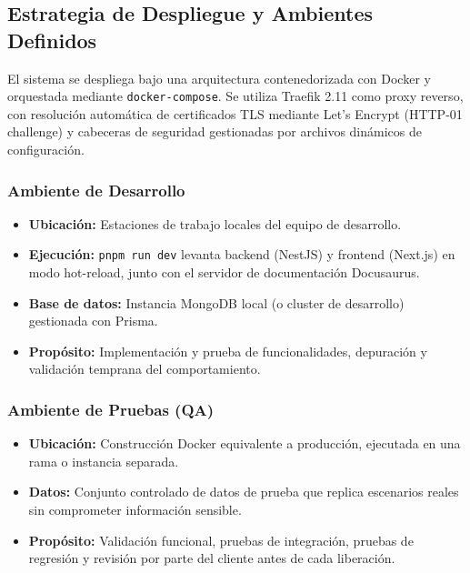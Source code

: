 \subsection{Estrategia de Despliegue y Ambientes Definidos}

El sistema se despliega bajo una arquitectura contenedorizada con Docker y orquestada mediante \texttt{docker-compose}. Se utiliza Traefik 2.11 como proxy reverso, con resolución automática de certificados TLS mediante Let's Encrypt (HTTP-01 challenge) y cabeceras de seguridad gestionadas por archivos dinámicos de configuración.

\subsubsection{Ambiente de Desarrollo}
\begin{itemize}
    \item \textbf{Ubicación:} Estaciones de trabajo locales del equipo de desarrollo.
    \item \textbf{Ejecución:} \texttt{pnpm run dev} levanta backend (NestJS) y frontend (Next.js) en modo hot-reload, junto con el servidor de documentación Docusaurus.
    \item \textbf{Base de datos:} Instancia MongoDB local (o cluster de desarrollo) gestionada con Prisma.
    \item \textbf{Propósito:} Implementación y prueba de funcionalidades, depuración y validación temprana del comportamiento.
\end{itemize}

\subsubsection{Ambiente de Pruebas (QA)}
\begin{itemize}
    \item \textbf{Ubicación:} Construcción Docker equivalente a producción, ejecutada en una rama o instancia separada.
    \item \textbf{Datos:} Conjunto controlado de datos de prueba que replica escenarios reales sin comprometer información sensible.
    \item \textbf{Propósito:} Validación funcional, pruebas de integración, pruebas de regresión y revisión por parte del cliente antes de cada liberación.
\end{itemize}

